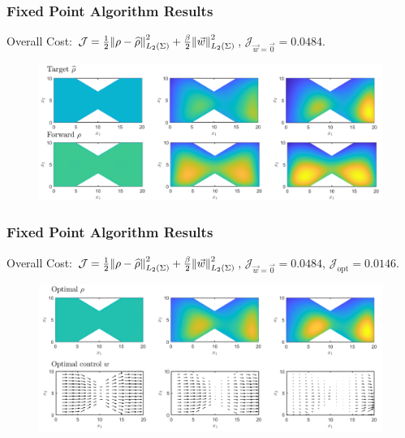 \documentclass[aspectratio=169,xcolor=dvipsnames]{beamer}
\begin{document}
\begin{frame}
	\frametitle{Fixed Point Algorithm Results}
	Overall Cost: $\mathcal J = \frac{1}{2}\norm{\rho- \widehat{\rho}}_{L_2(\Sigma)}^2 + \frac{\beta}{2} \norm{\vec{w}}_{L_2(\Sigma)}^2$, $\mathcal J_{\vec{w}= \vec 0} = 0.0484$.
	\vspace{0.3 cm}
	\begin{figure}
		\includegraphics[width=14cm]{ExRes2a2.png}
	\end{figure}
	
\end{frame}
\begin{frame}
	\frametitle{Fixed Point Algorithm Results}
	\vspace{0.3cm}
	Overall Cost: $\mathcal J = \frac{1}{2}\norm{\rho- \widehat{\rho}}_{L_2(\Sigma)}^2 + \frac{\beta}{2} \norm{\vec{w}}_{L_2(\Sigma)}^2$, $\mathcal J_{\vec{w} = \vec 0} = 0.0484$, $\mathcal J_{\text{opt}} = 0.0146$.
	\begin{figure}
		\includegraphics[width=14cm]{ExRes2b3.png}
	\end{figure}
\end{frame}
\end{document}
